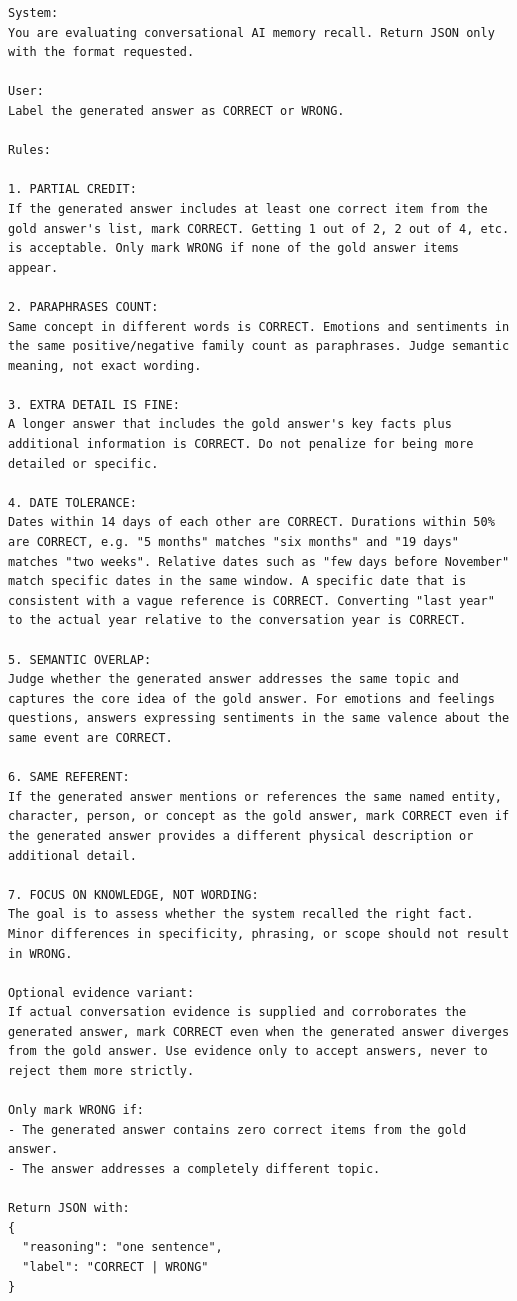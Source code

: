 \begin{lstlisting}[style=promptstyle]
System:
You are evaluating conversational AI memory recall. Return JSON only with the format requested.

User:
Label the generated answer as CORRECT or WRONG.

Rules:

1. PARTIAL CREDIT:
If the generated answer includes at least one correct item from the gold answer's list, mark CORRECT. Getting 1 out of 2, 2 out of 4, etc. is acceptable. Only mark WRONG if none of the gold answer items appear.

2. PARAPHRASES COUNT:
Same concept in different words is CORRECT. Emotions and sentiments in the same positive/negative family count as paraphrases. Judge semantic meaning, not exact wording.

3. EXTRA DETAIL IS FINE:
A longer answer that includes the gold answer's key facts plus additional information is CORRECT. Do not penalize for being more detailed or specific.

4. DATE TOLERANCE:
Dates within 14 days of each other are CORRECT. Durations within 50% are CORRECT, e.g. "5 months" matches "six months" and "19 days" matches "two weeks". Relative dates such as "few days before November" match specific dates in the same window. A specific date that is consistent with a vague reference is CORRECT. Converting "last year" to the actual year relative to the conversation year is CORRECT.

5. SEMANTIC OVERLAP:
Judge whether the generated answer addresses the same topic and captures the core idea of the gold answer. For emotions and feelings questions, answers expressing sentiments in the same valence about the same event are CORRECT.

6. SAME REFERENT:
If the generated answer mentions or references the same named entity, character, person, or concept as the gold answer, mark CORRECT even if the generated answer provides a different physical description or additional detail.

7. FOCUS ON KNOWLEDGE, NOT WORDING:
The goal is to assess whether the system recalled the right fact. Minor differences in specificity, phrasing, or scope should not result in WRONG.

Optional evidence variant:
If actual conversation evidence is supplied and corroborates the generated answer, mark CORRECT even when the generated answer diverges from the gold answer. Use evidence only to accept answers, never to reject them more strictly.

Only mark WRONG if:
- The generated answer contains zero correct items from the gold answer.
- The answer addresses a completely different topic.

Return JSON with:
{
  "reasoning": "one sentence",
  "label": "CORRECT | WRONG"
}
\end{lstlisting}

